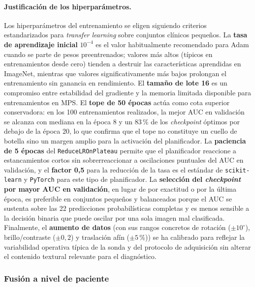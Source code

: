 \documentclass[12pt]{extarticle}
\numberwithin{equation}{section}
\begin{document}
\begin{refsection}
\paragraph{Justificación de los hiperparámetros.} Los hiperparámetros del entrenamiento se eligen siguiendo criterios estandarizados para \textit{transfer learning} sobre conjuntos clínicos pequeños. La \textbf{tasa de aprendizaje inicial} $10^{-4}$ es el valor habitualmente recomendado para Adam cuando se parte de pesos preentrenados; valores más altos (típicos en entrenamientos desde cero) tienden a destruir las características aprendidas en ImageNet, mientras que valores significativamente más bajos prolongan el entrenamiento sin ganancia en rendimiento. El \textbf{tamaño de lote 16} es un compromiso entre estabilidad del gradiente y la memoria limitada disponible para entrenamientos en MPS. El \textbf{tope de 50 épocas} actúa como cota superior conservadora: en los 100 entrenamientos realizados, la mejor AUC en validación se alcanza con mediana en la época 8 y un 83\,\% de los \textit{checkpoint} óptimos por debajo de la época 20, lo que confirma que el tope no constituye un cuello de botella sino un margen amplio para la activación del planificador. La \textbf{paciencia de 5 épocas} del \texttt{Reduce\allowbreak LROn\allowbreak Plateau} permite que el planificador reaccione a estancamientos cortos sin sobrerreaccionar a oscilaciones puntuales del AUC en validación, y el \textbf{factor 0,5} para la reducción de la tasa es el estándar de \texttt{scikit-learn} y \texttt{PyTorch} para este tipo de planificador. La \textbf{selección del \textit{checkpoint} por mayor AUC en validación}, en lugar de por exactitud o por la última época, es preferible en conjuntos pequeños y balanceados porque el AUC se sustenta sobre las 22 predicciones probabilísticas completas y es menos sensible a la decisión binaria que puede oscilar por una sola imagen mal clasificada. Finalmente, el \textbf{aumento de datos} (con sus rangos concretos de rotación ($\pm 10^{\circ}$), brillo/contraste ($\pm 0{,}2$) y traslación afín ($\pm 5$\,\%)) se ha calibrado para reflejar la variabilidad operativa típica de la sonda y del protocolo de adquisición sin alterar el contenido textural relevante para el diagnóstico.

\subsubsection{Fusión a nivel de paciente}


\end{refsection}
\end{document}
